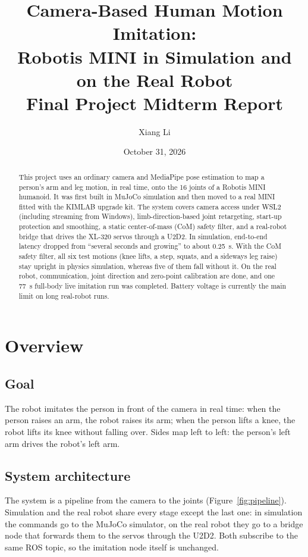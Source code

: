 \documentclass[11pt,a4paper]{article}
\title{\textbf{Camera-Based Human Motion Imitation:\\Robotis MINI in Simulation and on the Real Robot}\\[4pt]\large Final Project Midterm Report}
\author{Xiang Li}
\date{October 31, 2026}
\begin{document}
\maketitle
\thispagestyle{empty}

\begin{abstract}
\noindent
This project uses an ordinary camera and MediaPipe pose estimation to map a person's arm and leg motion, in real time, onto the 16 joints of a Robotis MINI humanoid. It was first built in MuJoCo simulation and then moved to a real MINI fitted with the KIMLAB upgrade kit. The system covers camera access under WSL2 (including streaming from Windows), limb-direction-based joint retargeting, start-up protection and smoothing, a static center-of-mass (CoM) safety filter, and a real-robot bridge that drives the XL-320 servos through a U2D2. In simulation, end-to-end latency dropped from ``several seconds and growing'' to about 0.25~s. With the CoM safety filter, all six test motions (knee lifts, a step, squats, and a sideways leg raise) stay upright in physics simulation, whereas five of them fall without it. On the real robot, communication, joint direction and zero-point calibration are done, and one 77~s full-body live imitation run was completed. Battery voltage is currently the main limit on long real-robot runs.
\end{abstract}

\tableofcontents
\vspace{1em}

\section{Overview}

\subsection{Goal}
The robot imitates the person in front of the camera in real time: when the person raises an arm, the robot raises its arm; when the person lifts a knee, the robot lifts its knee without falling over. Sides map left to left: the person's left arm drives the robot's left arm.

\subsection{System architecture}
The system is a pipeline from the camera to the joints (Figure~\ref{fig:pipeline}). Simulation and the real robot share every stage except the last one: in simulation the commands go to the MuJoCo simulator, on the real robot they go to a bridge node that forwards them to the servos through the U2D2. Both subscribe to the same ROS topic, so the imitation node itself is unchanged.
\end{document}
